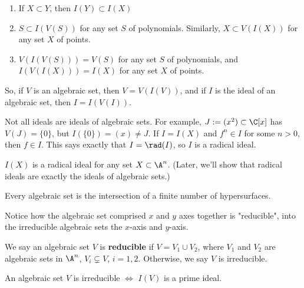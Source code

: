 \begin{prop}
    \begin{enumerate}
        \item If $X \subset Y$, then $I(Y) \subset I(X)$
        \item $S \subset I(V(S))$ for any set $S$ of polynomials. Similarly, $X \subset V(I(X))$ for any set $X$ of points.
        \item $V(I(V(S))) = V(S)$ for any set $S$ of polynomials, and $I(V(I(X)))=I(X)$ for any set $X$ of points.
    \end{enumerate}
    So, if $V$ is an algebraic set, then $V = V(I(V))$, and if $I$ is the ideal of an algebraic set, then $I=I(V(I))$.
\end{prop}

\begin{ex}
    Not all ideals are ideals of algebraic sets. For example, $J:= (x^2) \subset \C[x]$ has $V(J)=\{0\}$, but $I(\{ 0\}) = (x) \neq J$. If $I = I(X)$ and $f^n \in I$ for some $n >0$, then $f \in I$. This says exactly that $I = \rad (I)$, so $I$ is a radical ideal.
\end{ex}

\begin{prop}
    $I(X)$ is a radical ideal for any set $X \subset \A^n$. (Later, we'll show that radical ideals are exactly the ideals of algebraic sets.)
\end{prop}

\begin{thm}
    Every algebraic set is the intersection of a finite number of hypersurfaces.
\end{thm}

\begin{notebox*}
    Notice how the algebraic set comprised $x$ and $y$ axes together is "reducible", into the irreducible algebraic sets the $x$-axis and $y$-axis.
\end{notebox*}

\begin{defn}
    We say an algebraic set $V$ is \textbf{reducible} if $V = V_1 \cup V_2$, where $V_1$ and $V_2$ are algebraic sets in $\A^n$, $V_i \subsetneq V$, $i=1,2$. Otherwise, we say $V$ is irreducible.
\end{defn}

\begin{prop}
    An algebraic set $V$ is irreducible $\iff$ $I(V)$ is a prime ideal.
\end{prop}

